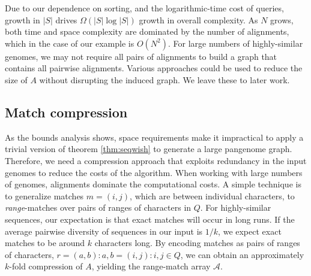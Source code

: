 \documentclass{bioinfo}
\theoremstyle{definition}
\begin{document}
Due to our dependence on sorting, and the logarithmic-time cost of queries, growth in $|S|$ drives $\Omega(|S| \log |S|)$ growth in overall complexity.
As $N$ grows, both time and space complexity are dominated by the number of alignments, which in the case of our example is $O(N^2)$.
For large numbers of highly-similar genomes, we may not require all pairs of alignments to build a graph that contains all pairwise alignments.
Various approaches could be used to reduce the size of $A$ without disrupting the induced graph.
We leave these to later work.





\subsection{Match compression}
\label{sec:matchcompression}

As the bounds analysis shows, space requirements make it impractical to apply a trivial version of theorem \ref{thm:seqwish} to generate a large pangenome graph.
Therefore, we need a compression approach that exploits redundancy in the input genomes to reduce the costs of the algorithm.
When working with large numbers of genomes, alignments dominate the computational costs.
A simple technique is to generalize matches $m = (i, j)$, which are between individual characters, to \textit{range}-matches over pairs of ranges of characters in $Q$.
For highly-similar sequences, our expectation is that exact matches will occur in long runs.
If the average pairwise diversity of sequences in our input is $1/k$, we expect exact matches to be around $k$ characters long.
By encoding matches as pairs of ranges of characters, $r = (a, b) : a, b = (i, j) : i, j \in Q$, we can obtain an approximately $k$-fold compression of $A$, yielding the range-match array $\mathcal{A}$.
\end{document}
